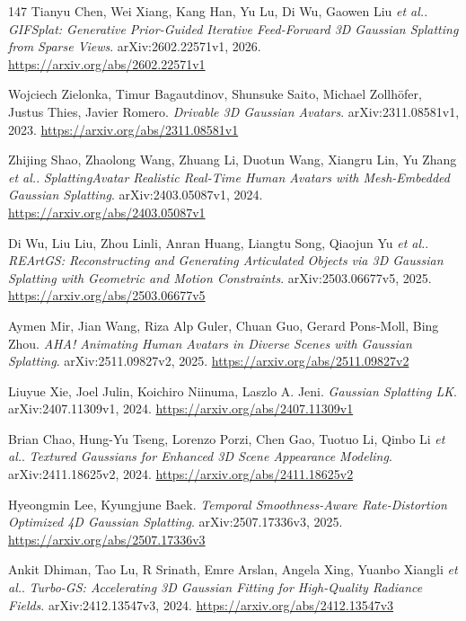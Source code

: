 \documentclass[11pt,a4paper]{article}
\begin{document}
\begin{thebibliography}{147}
Tianyu Chen, Wei Xiang, Kang Han, Yu Lu, Di Wu, Gaowen Liu \emph{et al.}.
\newblock \emph{GIFSplat: Generative Prior-Guided Iterative Feed-Forward 3D Gaussian Splatting from Sparse Views}.
\newblock arXiv:2602.22571v1, 2026.
\newblock \url{https://arxiv.org/abs/2602.22571v1}

Wojciech Zielonka, Timur Bagautdinov, Shunsuke Saito, Michael Zollh\"{o}fer, Justus Thies, Javier Romero.
\newblock \emph{Drivable 3D Gaussian Avatars}.
\newblock arXiv:2311.08581v1, 2023.
\newblock \url{https://arxiv.org/abs/2311.08581v1}

Zhijing Shao, Zhaolong Wang, Zhuang Li, Duotun Wang, Xiangru Lin, Yu Zhang \emph{et al.}.
\newblock \emph{SplattingAvatar Realistic Real-Time Human Avatars with Mesh-Embedded Gaussian Splatting}.
\newblock arXiv:2403.05087v1, 2024.
\newblock \url{https://arxiv.org/abs/2403.05087v1}

Di Wu, Liu Liu, Zhou Linli, Anran Huang, Liangtu Song, Qiaojun Yu \emph{et al.}.
\newblock \emph{REArtGS: Reconstructing and Generating Articulated Objects via 3D Gaussian Splatting with Geometric and Motion Constraints}.
\newblock arXiv:2503.06677v5, 2025.
\newblock \url{https://arxiv.org/abs/2503.06677v5}

Aymen Mir, Jian Wang, Riza Alp Guler, Chuan Guo, Gerard Pons-Moll, Bing Zhou.
\newblock \emph{AHA! Animating Human Avatars in Diverse Scenes with Gaussian Splatting}.
\newblock arXiv:2511.09827v2, 2025.
\newblock \url{https://arxiv.org/abs/2511.09827v2}

Liuyue Xie, Joel Julin, Koichiro Niinuma, Laszlo A. Jeni.
\newblock \emph{Gaussian Splatting LK}.
\newblock arXiv:2407.11309v1, 2024.
\newblock \url{https://arxiv.org/abs/2407.11309v1}

Brian Chao, Hung-Yu Tseng, Lorenzo Porzi, Chen Gao, Tuotuo Li, Qinbo Li \emph{et al.}.
\newblock \emph{Textured Gaussians for Enhanced 3D Scene Appearance Modeling}.
\newblock arXiv:2411.18625v2, 2024.
\newblock \url{https://arxiv.org/abs/2411.18625v2}

Hyeongmin Lee, Kyungjune Baek.
\newblock \emph{Temporal Smoothness-Aware Rate-Distortion Optimized 4D Gaussian Splatting}.
\newblock arXiv:2507.17336v3, 2025.
\newblock \url{https://arxiv.org/abs/2507.17336v3}

Ankit Dhiman, Tao Lu, R Srinath, Emre Arslan, Angela Xing, Yuanbo Xiangli \emph{et al.}.
\newblock \emph{Turbo-GS: Accelerating 3D Gaussian Fitting for High-Quality Radiance Fields}.
\newblock arXiv:2412.13547v3, 2024.
\newblock \url{https://arxiv.org/abs/2412.13547v3}


\end{thebibliography}
\end{document}
